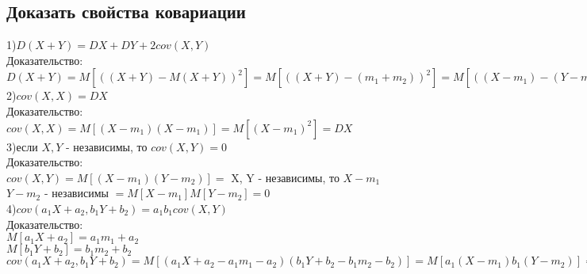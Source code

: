 \subsection{Доказать свойства ковариации}
1)$D(X + Y) = DX + DY + 2cov(X, Y)$\\
Доказательство:\\
$D(X + Y) = M[((X + Y) - M(X + Y))^{2}] = M[((X + Y) - (m_{1} + m_{2}))^{2}] = M[((X - m_{1}) - (Y - m_{2}))^{2}] = M[(X - m_{1})^{2}] + M[(Y - m_{2})^{2}] + 2M[(X - m_{1})(Y - m_{2})] = DX + DY + 2cov(X, Y)$\\

2)$cov(X, X) = DX$\\
Доказательство:\\
$cov(X, X) = M[(X - m_{1})(X - m_{1})] = M[(X - m_{1})^{2}] = DX$\\

3)если $X, Y$ - независимы, то $cov(X, Y) = 0$\\
Доказательство:\\
$cov(X, Y) = M[(X - m_{1})(Y - m_{2})] = $ X, Y - независимы, то $X - m_{1}$ $Y - m_{2}$ - независимы $ = M[X - m_{1}] M[Y - m_{2}] = 0$\\

4)$cov(a_{1} X + a_{2}, b_{1} Y + b_{2}) = a_{1} b_{1} cov(X, Y)$\\
Доказательство:\\
$M[a_{1} X + a_{2}] = a_{1} m_{1} + a_{2}$\\
$M[b_{1} Y + b_{2}] = b_{1} m_{2} + b_{2}$\\
$cov(a_{1} X + a_{2}, b_{1} Y + b_{2}) = M[(a_{1} X + a_{2} - a_{1} m_{1} - a_{2})(b_{1} Y + b_{2} - b_{1} m_{2} - b_{2})] = M[a_{1} (X - m_{1}) b_{1} (Y - m_{2})] = a_{1} b_{1} M[(X - m_{1})(Y - m_{2})] = a_{1} b_{1} cov (X, Y)$\\

